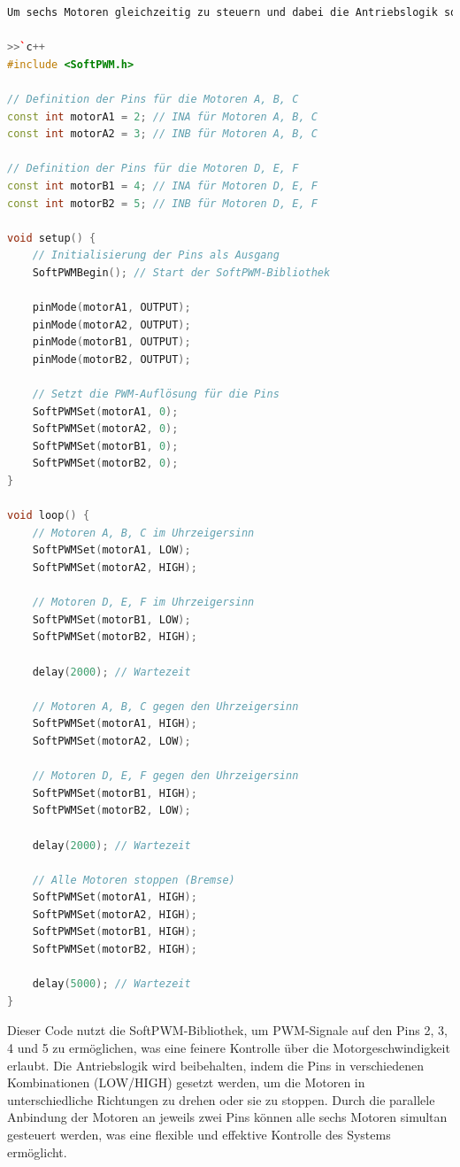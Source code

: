 \documentclass{vorlage-design-main}
\begin{document}
\begin{lstlisting}[language={C++}]
Um sechs Motoren gleichzeitig zu steuern und dabei die Antriebslogik sowie die Nutzung der SoftPWM-Bibliothek für das Arduino-Board zu berücksichtigen, muss der vorgegebene Code erweitert werden. Da die Pins 2 und 3 für die Steuerung der Motoren A, B, C und die Pins 4 und 5 für die Steuerung der Motoren D, E, F verwendet werden, kann der Code wie folgt angepasst werden, um alle sechs Motoren gleichzeitig zu steuern:

>>`c++
#include <SoftPWM.h>

// Definition der Pins für die Motoren A, B, C
const int motorA1 = 2; // INA für Motoren A, B, C
const int motorA2 = 3; // INB für Motoren A, B, C

// Definition der Pins für die Motoren D, E, F
const int motorB1 = 4; // INA für Motoren D, E, F
const int motorB2 = 5; // INB für Motoren D, E, F

void setup() {
    // Initialisierung der Pins als Ausgang
    SoftPWMBegin(); // Start der SoftPWM-Bibliothek
    
    pinMode(motorA1, OUTPUT);
    pinMode(motorA2, OUTPUT);
    pinMode(motorB1, OUTPUT);
    pinMode(motorB2, OUTPUT);

    // Setzt die PWM-Auflösung für die Pins
    SoftPWMSet(motorA1, 0);
    SoftPWMSet(motorA2, 0);
    SoftPWMSet(motorB1, 0);
    SoftPWMSet(motorB2, 0);
}

void loop() {
    // Motoren A, B, C im Uhrzeigersinn
    SoftPWMSet(motorA1, LOW);
    SoftPWMSet(motorA2, HIGH);
    
    // Motoren D, E, F im Uhrzeigersinn
    SoftPWMSet(motorB1, LOW);
    SoftPWMSet(motorB2, HIGH);
    
    delay(2000); // Wartezeit
    
    // Motoren A, B, C gegen den Uhrzeigersinn
    SoftPWMSet(motorA1, HIGH);
    SoftPWMSet(motorA2, LOW);
    
    // Motoren D, E, F gegen den Uhrzeigersinn
    SoftPWMSet(motorB1, HIGH);
    SoftPWMSet(motorB2, LOW);
    
    delay(2000); // Wartezeit
    
    // Alle Motoren stoppen (Bremse)
    SoftPWMSet(motorA1, HIGH);
    SoftPWMSet(motorA2, HIGH);
    SoftPWMSet(motorB1, HIGH);
    SoftPWMSet(motorB2, HIGH);
    
    delay(5000); // Wartezeit
}
\end{lstlisting}

Dieser Code nutzt die SoftPWM-Bibliothek, um PWM-Signale auf den Pins 2,
3, 4 und 5 zu ermöglichen, was eine feinere Kontrolle über die
Motorgeschwindigkeit erlaubt. Die Antriebslogik wird beibehalten, indem
die Pins in verschiedenen Kombinationen (LOW/HIGH) gesetzt werden, um
die Motoren in unterschiedliche Richtungen zu drehen oder sie zu
stoppen. Durch die parallele Anbindung der Motoren an jeweils zwei Pins
können alle sechs Motoren simultan gesteuert werden, was eine flexible
und effektive Kontrolle des Systems ermöglicht.
\end{document}
